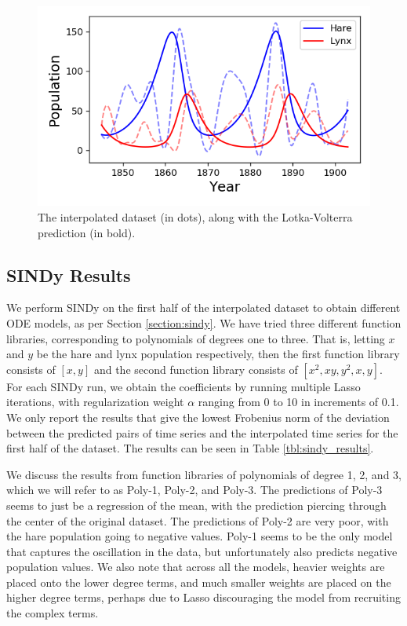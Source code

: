 \documentclass[letterpaper, 10 pt, conference]{ieeeconf}  %
\begin{document}
\begin{figure}[htb] 
\centering
\includegraphics[width=0.97\columnwidth]{images/lotka.png}
\caption{The interpolated dataset (in dots), along with the Lotka-Volterra prediction (in bold).}
\label{fig:lotka}
\end{figure}

\subsection{SINDy Results}
\label{section:sindy_results}
We perform SINDy on the first half of the interpolated dataset to obtain different ODE models, as per Section \ref{section:sindy}. We have tried three different function libraries, corresponding to polynomials of degrees one to three. That is, letting $x$ and $y$ be the hare and lynx population respectively, then the first function library consists of $[x, y]$ and the second function library consists of $[x^2, xy, y^2, x, y]$. For each SINDy run, we obtain the coefficients by running multiple Lasso iterations, with regularization weight $\alpha$ ranging from 0 to 10 in increments of 0.1. We only report the results that give the lowest Frobenius norm of the deviation between the predicted pairs of time series and the interpolated time series for the first half of the dataset. The results can be seen in Table \ref{tbl:sindy_results}.

We discuss the results from function libraries of polynomials of degree 1, 2, and 3, which we will refer to as Poly-1, Poly-2, and Poly-3. The predictions of Poly-3 seems to just be a regression of the mean, with the prediction piercing through the center of the original dataset. The predictions of Poly-2 are very poor, with the hare population going to negative values. Poly-1 seems to be the only model that captures the oscillation in the data, but unfortunately also predicts negative population values. We also note that across all the models, heavier weights are placed onto the lower degree terms, and much smaller weights are placed on the higher degree terms, perhaps due to Lasso discouraging the model from recruiting the complex terms.
\end{document}
